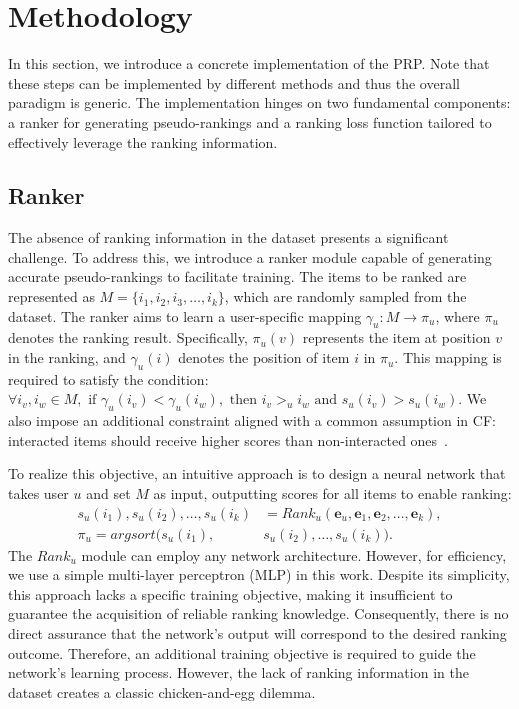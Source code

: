 \section{Methodology}
In this section, we introduce a concrete implementation of the PRP. Note that these steps can be implemented by different methods and thus the overall paradigm is generic. The implementation hinges on two fundamental components: a ranker for generating pseudo-rankings and a ranking loss function tailored to effectively leverage the ranking information.

\subsection{Ranker}
The absence of ranking information in the dataset presents a significant challenge. To address this, we introduce a ranker module capable of generating accurate pseudo-rankings to facilitate training. The items to be ranked are represented as $M = \{i_1, i_2, i_3, \dots, i_k\}$, which are randomly sampled from the dataset. The ranker aims to learn a user-specific mapping $\gamma_{u}: M \rightarrow \pi_{u}$, where $\pi_{u}$ denotes the ranking result. Specifically, $\pi_{u}(v)$ represents the item at position $v$ in the ranking, and $\gamma_{u}(i)$ denotes the position of item $i$ in $\pi_{u}$. This mapping is required to satisfy the condition: $\forall i_v, i_w \in M, \text{ if } \gamma_{u}(i_v) < \gamma_{u}(i_w), \text{ then } i_v >_u i_w \text{ and } s_u(i_v) > s_u(i_w)$. We also impose an additional constraint aligned with a common assumption in CF: interacted items should receive higher scores than non-interacted ones~\cite{PC13,RFG12, MZW21}.

To realize this objective, an intuitive approach is to design a neural network that takes user $u$ and set $M$ as input, outputting scores for all items to enable ranking:
\begin{equation}
\begin{aligned}
s_u(i_1),s_u(i_2),\ldots, s_u(i_k) &= Rank_{u}(\mathbf{e}_{u},\mathbf{e}_{1},\mathbf{e}_{2},...,\mathbf{e}_{k}), \\
\pi_{u} = argsort(s_u(i_1),&s_u(i_2),\ldots, s_u(i_k)).
\label{eq:Prank}
\end{aligned}
\end{equation}
The $Rank_{u}$ module can employ any network architecture. However, for efficiency, we use a simple multi-layer perceptron (MLP) in this work. Despite its simplicity, this approach lacks a specific training objective, making it insufficient to guarantee the acquisition of reliable ranking knowledge. Consequently, there is no direct assurance that the network's output will correspond to the desired ranking outcome. Therefore, an additional training objective is required to guide the network's learning process. However, the lack of ranking information in the dataset creates a classic chicken-and-egg dilemma.

